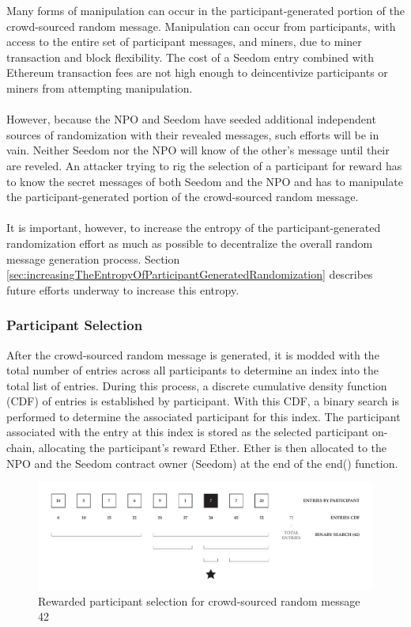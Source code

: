 \documentclass[11pt]{article}
\begin{document}
Many forms of manipulation can occur in the participant-generated portion of the crowd-sourced random message. Manipulation can occur from participants, with access to the entire set of participant messages, and miners, due to miner transaction and block flexibility. The cost of a Seedom entry combined with Ethereum transaction fees are not high enough to deincentivize participants or miners from attempting manipulation.\\\\
However, because the NPO and Seedom have seeded additional independent sources of randomization with their revealed messages, such efforts will be in vain. Neither Seedom nor the NPO will know of the other's message until their are reveled. An attacker trying to rig the selection of a participant for reward has to know the secret messages of both Seedom and the NPO and has to manipulate the participant-generated portion of the crowd-sourced random message.\\\\
It is important, however, to increase the entropy of the participant-generated randomization effort as much as possible to decentralize the overall random message generation process. Section \ref{sec:increasingTheEntropyOfParticipantGeneratedRandomization} describes future efforts underway to increase this entropy.

\subsubsection{Participant Selection}

After the crowd-sourced random message is generated, it is modded with the total number of entries across all participants to determine an index into the total list of entries. During this process, a discrete cumulative density function (CDF) of entries is established by participant. With this CDF, a binary search is performed to determine the associated participant for this index. The participant associated with the entry at this index is stored as the selected participant on-chain, allocating the participant's reward Ether. Ether is then allocated to the NPO and the Seedom contract owner (Seedom) at the end of the end() function.

\begin{figure}[H]
\begin{center}
\includegraphics[width=1.0\textwidth]{./graphics/rewarded-participant-selection.pdf}
\caption{Rewarded participant selection for crowd-sourced random message 42}
\label{figure:participantSelection}
\end{center}
\end{figure}
\end{document}

